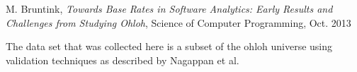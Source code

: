 \begin{thebibliography}{99}

		M. Bruntink, \emph{Towards Base Rates in Software Analytics: Early Results
		and Challenges from Studying Ohloh}, Science of Computer Programming, Oct.
		2013
		
		The data set that was collected here is a subset of the ohloh universe using
		validation techniques as described by Nagappan et al.

\end{thebibliography}
